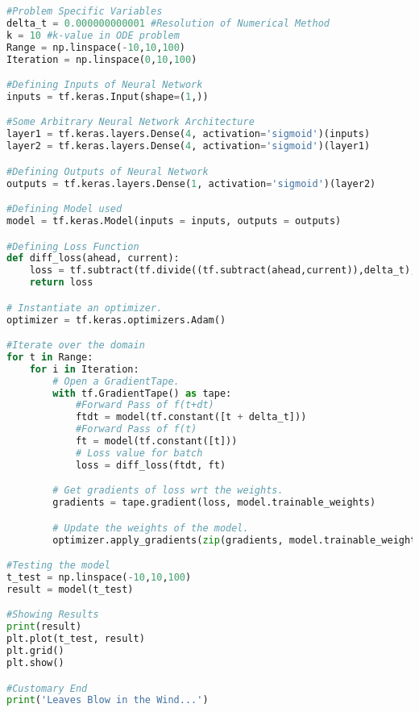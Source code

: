 \documentclass[a4paper, 12pt]{report}
\begin{document}
\begin{center}
\begin{lstlisting}[language = Python]
#Problem Specific Variables
delta_t = 0.000000000001 #Resolution of Numerical Method
k = 10 #k-value in ODE problem
Range = np.linspace(-10,10,100)
Iteration = np.linspace(0,10,100)

#Defining Inputs of Neural Network
inputs = tf.keras.Input(shape=(1,))

#Some Arbitrary Neural Network Architecture
layer1 = tf.keras.layers.Dense(4, activation='sigmoid')(inputs)
layer2 = tf.keras.layers.Dense(4, activation='sigmoid')(layer1)

#Defining Outputs of Neural Network
outputs = tf.keras.layers.Dense(1, activation='sigmoid')(layer2)

#Defining Model used
model = tf.keras.Model(inputs = inputs, outputs = outputs)

#Defining Loss Function        
def diff_loss(ahead, current):
    loss = tf.subtract(tf.divide((tf.subtract(ahead,current)),delta_t),tf.multiply(k,current))
    return loss

# Instantiate an optimizer.
optimizer = tf.keras.optimizers.Adam()

#Iterate over the domain
for t in Range:
    for i in Iteration:
        # Open a GradientTape.
        with tf.GradientTape() as tape:
            #Forward Pass of f(t+dt)
            ftdt = model(tf.constant([t + delta_t]))
            #Forward Pass of f(t)
            ft = model(tf.constant([t]))
            # Loss value for batch
            loss = diff_loss(ftdt, ft)

        # Get gradients of loss wrt the weights.
        gradients = tape.gradient(loss, model.trainable_weights)

        # Update the weights of the model.
        optimizer.apply_gradients(zip(gradients, model.trainable_weights))

#Testing the model
t_test = np.linspace(-10,10,100)
result = model(t_test)

#Showing Results
print(result)
plt.plot(t_test, result)
plt.grid()
plt.show()

#Customary End
print('Leaves Blow in the Wind...')
\end{lstlisting}
\end{center}
\end{document}
